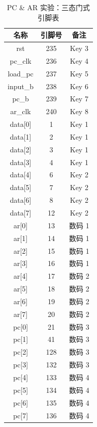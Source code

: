 \begin{enumerate}
    \begin{table}[H]
        \centering
        \begin{tabular}{|c|c|c|}
            \hline
            名称 & 引脚号 & 备注 \\
            \hline
            rst & 235 & Key 3 \\
            \hline
            pc\_clk & 236 & Key 4 \\
            \hline
            load\_pc & 237 & Key 5 \\
            \hline
            input\_b & 238 & Key 6 \\
            \hline
            pc\_b & 239 & Key 7 \\
            \hline
            ar\_clk & 240 & Key 8 \\
            \hline
            data[0] & 1 & Key 1 \\
            \hline
            data[1] & 2 & Key 1 \\
            \hline
            data[2] & 3 & Key 1 \\
            \hline
            data[3] & 4 & Key 1 \\
            \hline
            data[4] & 6 & Key 2 \\
            \hline
            data[5] & 7 & Key 2 \\
            \hline
            data[6] & 8 & Key 2 \\
            \hline
            data[7] & 12 & Key 2 \\
            \hline
            ar[0] & 13 & 数码 1 \\
            \hline
            ar[1] & 14 & 数码 1 \\
            \hline
            ar[2] & 15 & 数码 1 \\
            \hline
            ar[3] & 16 & 数码 1 \\
            \hline
            ar[4] & 17 & 数码 2 \\
            \hline
            ar[5] & 18 & 数码 2 \\
            \hline
            ar[6] & 19 & 数码 2 \\
            \hline
            ar[7] & 20 & 数码 2 \\
            \hline
            pc[0] & 21 & 数码 3 \\
            \hline
            pc[1] & 41 & 数码 3 \\
            \hline
            pc[2] & 128 & 数码 3 \\
            \hline
            pc[3] & 132 & 数码 3 \\
            \hline
            pc[4] & 133 & 数码 4 \\
            \hline
            pc[5] & 134 & 数码 4 \\
            \hline
            pc[6] & 135 & 数码 4 \\
            \hline
            pc[7] & 136 & 数码 4 \\
            \hline
        \end{tabular}
        \caption{PC \& AR 实验：三态门式引脚表}
        \label{tab:pin4_2}
    \end{table}
    

\end{enumerate}
